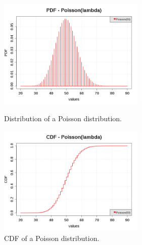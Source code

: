 \begin{figure}[H]
  \begin{minipage}{10cm}
    \begin{center}
      \includegraphics[width=7cm]{pdf_Poisson.png}
      \caption{Distribution of a Poisson distribution.}
      \label{PDFPoisson}
    \end{center}
  \end{minipage}
  \hfill
  \begin{minipage}{10cm}
    \begin{center}
      \includegraphics[width=7cm]{cdf_Poisson.png}
      \caption{CDF of a Poisson distribution.}
      \label{CDFPoisson}
    \end{center}
  \end{minipage}
\end{figure}



